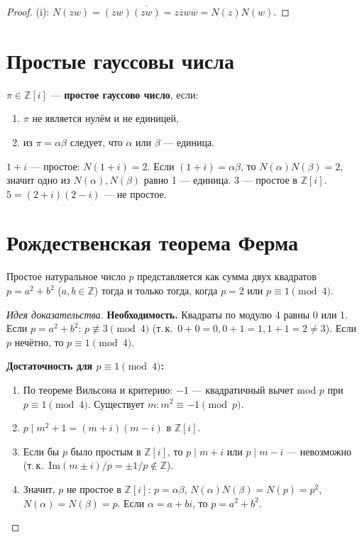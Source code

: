 \documentclass[12pt]{article}
\begin{document}
\begin{proof}
(i): $N(zw) = (zw)\overline{(zw)} = z\overline{z}w\overline{w} = N(z)N(w)$.
\end{proof}

\section{Простые гауссовы числа}

\begin{definition}
$\pi \in \mathbb{Z}[i]$ --- \textbf{простое гауссово число}, если:
\begin{enumerate}[(1)]
\item $\pi$ не является нулём и не единицей,
\item из $\pi = \alpha\beta$ следует, что $\alpha$ или $\beta$ --- единица.
\end{enumerate}
\end{definition}

\begin{example}
$1+i$ --- простое: $N(1+i)=2$. Если $(1+i)=\alpha\beta$, то
$N(\alpha)N(\beta)=2$, значит одно из $N(\alpha),N(\beta)$ равно 1 ---
единица. $3$ --- простое в $\mathbb{Z}[i]$. $5 = (2+i)(2-i)$ ---
не простое.
\end{example}

\section{Рождественская теорема Ферма}

\begin{theorem}
Простое натуральное число $p$ представляется как сумма двух квадратов
$p = a^2 + b^2$ ($a, b \in \mathbb{Z}$) тогда и только тогда, когда
$p = 2$ или $p \equiv 1 \pmod{4}$.
\end{theorem}

\begin{proof}[Идея доказательства]
\textbf{Необходимость.} Квадраты по модулю 4 равны 0 или 1.
Если $p = a^2 + b^2$:
$p \not\equiv 3 \pmod{4}$ (т.\,к.\ $0+0=0,0+1=1,1+1=2\neq 3$).
Если $p$ нечётно, то $p \equiv 1 \pmod 4$.

\textbf{Достаточность для $p \equiv 1\pmod 4$:}
\begin{enumerate}
\item По теореме Вильсона и критерию: $-1$ --- квадратичный вычет
      mod $p$ при $p \equiv 1 \pmod 4$. Существует $m\colon m^2 \equiv -1 \pmod p$.
\item $p \mid m^2 + 1 = (m+i)(m-i)$ в $\mathbb{Z}[i]$.
\item Если бы $p$ было простым в $\mathbb{Z}[i]$, то $p \mid m+i$
      или $p \mid m-i$ --- невозможно (т.\,к.\ $\mathrm{Im}(m\pm i)/p = \pm 1/p \notin \mathbb{Z}$).
\item Значит, $p$ не простое в $\mathbb{Z}[i]$: $p = \alpha\beta$,
      $N(\alpha)N(\beta) = N(p) = p^2$, $N(\alpha)=N(\beta)=p$.
      Если $\alpha = a+bi$, то $p = a^2+b^2$.
\end{enumerate}
\end{proof}
\end{document}
